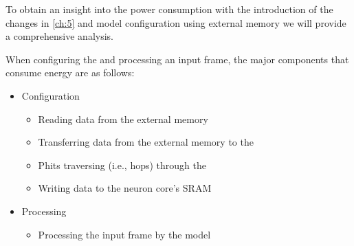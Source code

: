 To obtain an insight into the power consumption with the introduction of the \confignoc{} changes in \cref{ch:5} and model configuration using external memory we will provide a comprehensive analysis.

When configuring the \graicore{} and processing an input frame, the major components that consume energy are as follows:
\begin{itemize}
    \item Configuration
    \begin{itemize}
        \item Reading data from the external memory
        \item Transferring data from the external memory to the \confignoc{}
        \item Phits traversing (i.e., hops) through the \confignoc{}
        \item Writing data to the neuron core's SRAM
    \end{itemize}
    \item Processing
    \begin{itemize}
        \item Processing the input frame by the model
    \end{itemize}
\end{itemize}
